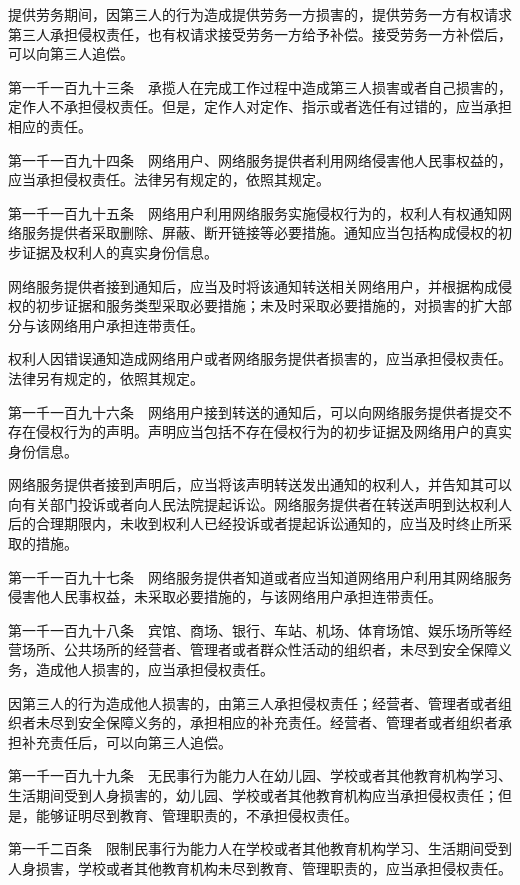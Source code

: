 \documentclass[UTF8,12pt,a4paper]{ctexbook}
\begin{document}
提供劳务期间，因第三人的行为造成提供劳务一方损害的，提供劳务一方有权请求第三人承担侵权责任，也有权请求接受劳务一方给予补偿。接受劳务一方补偿后，可以向第三人追偿。

第一千一百九十三条　承揽人在完成工作过程中造成第三人损害或者自己损害的，定作人不承担侵权责任。但是，定作人对定作、指示或者选任有过错的，应当承担相应的责任。

第一千一百九十四条　网络用户、网络服务提供者利用网络侵害他人民事权益的，应当承担侵权责任。法律另有规定的，依照其规定。

第一千一百九十五条　网络用户利用网络服务实施侵权行为的，权利人有权通知网络服务提供者采取删除、屏蔽、断开链接等必要措施。通知应当包括构成侵权的初步证据及权利人的真实身份信息。

网络服务提供者接到通知后，应当及时将该通知转送相关网络用户，并根据构成侵权的初步证据和服务类型采取必要措施；未及时采取必要措施的，对损害的扩大部分与该网络用户承担连带责任。

权利人因错误通知造成网络用户或者网络服务提供者损害的，应当承担侵权责任。法律另有规定的，依照其规定。

第一千一百九十六条　网络用户接到转送的通知后，可以向网络服务提供者提交不存在侵权行为的声明。声明应当包括不存在侵权行为的初步证据及网络用户的真实身份信息。

网络服务提供者接到声明后，应当将该声明转送发出通知的权利人，并告知其可以向有关部门投诉或者向人民法院提起诉讼。网络服务提供者在转送声明到达权利人后的合理期限内，未收到权利人已经投诉或者提起诉讼通知的，应当及时终止所采取的措施。

第一千一百九十七条　网络服务提供者知道或者应当知道网络用户利用其网络服务侵害他人民事权益，未采取必要措施的，与该网络用户承担连带责任。

第一千一百九十八条　宾馆、商场、银行、车站、机场、体育场馆、娱乐场所等经营场所、公共场所的经营者、管理者或者群众性活动的组织者，未尽到安全保障义务，造成他人损害的，应当承担侵权责任。

因第三人的行为造成他人损害的，由第三人承担侵权责任；经营者、管理者或者组织者未尽到安全保障义务的，承担相应的补充责任。经营者、管理者或者组织者承担补充责任后，可以向第三人追偿。

第一千一百九十九条　无民事行为能力人在幼儿园、学校或者其他教育机构学习、生活期间受到人身损害的，幼儿园、学校或者其他教育机构应当承担侵权责任；但是，能够证明尽到教育、管理职责的，不承担侵权责任。

第一千二百条　限制民事行为能力人在学校或者其他教育机构学习、生活期间受到人身损害，学校或者其他教育机构未尽到教育、管理职责的，应当承担侵权责任。
\end{document}
